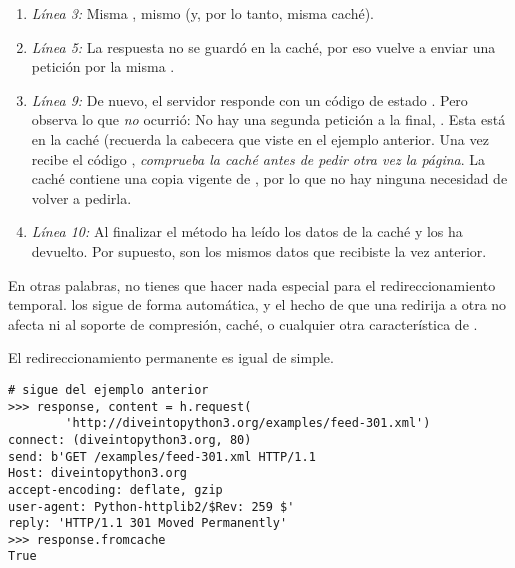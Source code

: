 \begin{enumerate}

\item \emph{Línea 3:} Misma , mismo  (y, por lo tanto, misma caché).

\item \emph{Línea 5:} La respuesta  no se guardó en la caché, por eso  vuelve a enviar una petición por la misma .

\item \emph{Línea 9:} De nuevo, el servidor responde con un código de estado . Pero observa lo que \emph{no} ocurrió: No hay una segunda petición a la  final, . Esta  está en la caché (recuerda la cabecera  que viste en el ejemplo anterior. Una vez  recibe el código , \emph{comprueba la caché antes de pedir otra vez la página}. La caché contiene una copia vigente de , por lo que no hay ninguna necesidad de volver a pedirla.

\item \emph{Línea 10:} Al finalizar el método  ha leído los datos de la caché y los ha devuelto. Por supuesto, son los mismos datos que recibiste la vez anterior.

\end{enumerate}

En otras palabras, no tienes que hacer nada especial para el redireccionamiento temporal.  los sigue de forma automática, y el hecho de que una  redirija a otra no afecta ni al soporte de compresión, caché,  o cualquier otra característica de .

El redireccionamiento permanente es igual de simple.

\noindent\begin{minipage}{\textwidth}
\begin{lstlisting}[mathescape=True]
# sigue del ejemplo anterior
>>> response, content = h.request(
        'http://diveintopython3.org/examples/feed-301.xml')
connect: (diveintopython3.org, 80)
send: b'GET /examples/feed-301.xml HTTP/1.1
Host: diveintopython3.org
accept-encoding: deflate, gzip
user-agent: Python-httplib2/$Rev: 259 $'
reply: 'HTTP/1.1 301 Moved Permanently'     
>>> response.fromcache          
True
\end{lstlisting}
\end{minipage}

